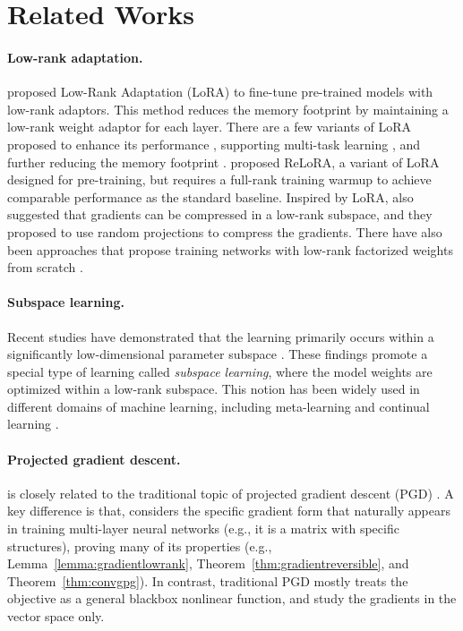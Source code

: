 
\section{Related Works}
\paragraph{Low-rank adaptation.}
\citet{huLoRALowRankAdaptation2021} proposed Low-Rank Adaptation (LoRA) to fine-tune pre-trained models with low-rank adaptors. 
This method reduces the memory footprint by maintaining a low-rank weight adaptor for each layer.
There are a few variants of LoRA proposed to enhance its performance \citep{renduchintalaTiedLoraEnhacingParameter2023, shengSLoRAServingThousands2023, zhangLORAFAMEMORYEFFICIENTLOWRANK, xiaChainLoRAEfficient2024}, supporting multi-task learning \citep{wangMultiLoRADemocratizingLoRA2023}, and further reducing the memory footprint \citep{dettmersQLoRAEfficientFinetuning2023}.
\citet{lialinReLoRAHighRankTraining2023} proposed ReLoRA, a variant of LoRA designed for pre-training, but requires a full-rank training warmup to achieve comparable performance as the standard baseline.
Inspired by LoRA, \citet{haoFloraLowRankAdapters2024} also suggested that gradients can be compressed in a low-rank subspace, and they proposed to use random projections to compress the gradients.
There have also been approaches that propose training networks with low-rank factorized weights from scratch \citep{kamalakaraExploringLowRank2022,wangCuttlefishLowrankModel2023,zhaoInRankIncrementalLowRank2023}.


\paragraph{Subspace learning.}
Recent studies have demonstrated that the learning primarily occurs within a significantly low-dimensional parameter subspace \citep{gur-ariGradientDescentHappens2018,larsenHowManyDegrees2022}.
These findings promote a special type of learning called \textit{subspace learning}, where the model weights are optimized within a low-rank subspace. 
This notion has been widely used in different domains of machine learning, including meta-learning and continual learning \citep{leeGradientBasedMetaLearningLearned2018,chaudhryContinualLearningLowrank2020}.

\paragraph{Projected gradient descent.}
\lowrank{} is closely related to the traditional topic of projected gradient descent (PGD) \citep{chenFastLowrankEstimation2015, chenNonConvexProjectedGradient2019}. 
A key difference is that, \lowrank{} considers the specific gradient form that naturally appears in training multi-layer neural networks (e.g., it is a matrix with specific structures), proving many of its properties (e.g., Lemma~\ref{lemma:gradientlowrank}, Theorem~\ref{thm:gradientreversible}, and Theorem~\ref{thm:convgpg}). In contrast, traditional PGD mostly treats the objective as a general blackbox nonlinear function, and study the gradients in the vector space only. 

